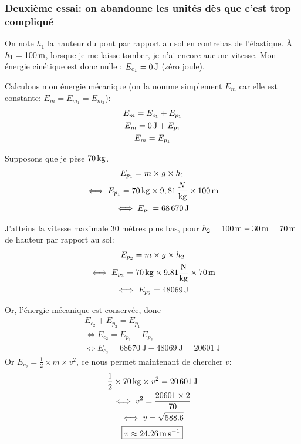 \subsubsection{Deuxième essai: on abandonne les unités dès que c'est trop compliqué}

On note $h_1$ la hauteur du pont par rapport au sol en contrebas de l'élastique. À $h_1=100\,\mathrm{m}$, lorsque je me laisse tomber, je n’ai encore aucune vitesse. Mon énergie cinétique est donc nulle : $E_{c_1} = 0\,\mathrm{J}$ (zéro joule).

Calculons mon énergie mécanique (on la nomme simplement $E_m$ car elle est constante: $E_m = E_{m_1} = E_{m_2}$):
\begin{gather*}
    E_m = E_{c_1} + E_{p_1} \\
    E_m = 0\,\mathrm{J }+ E_{p_1} \\
    E_m = E_{p_1}
\end{gather*}

Supposons que je pèse $70\,\mathrm{kg}$.
\begin{gather*}
    E_{p_1} = m \times g \times h_1 \\
    \iff E_{p_1} = 70\,\mathrm{kg} \times 9,81{\frac{N}{\,\mathrm{kg}}} \times 100\,\mathrm{m} \\
    \iff E_{p_1} = \SI{68670}{\joule}
\end{gather*}

J'atteins la vitesse maximale 30 mètres plus bas, pour $h_{2} = 100\,\mathrm{m} - 30\,\mathrm{m} = 70\,\mathrm{m}$ de hauteur par rapport au sol:
\begin{gather*}
    E_{p_2} = m \times g \times h_2 \\
    \iff E_{p_2} = 70\,\mathrm{kg} \times \num{9,81}{\frac{\mathrm{N}}{\mathrm{kg}}} \times 70\,\mathrm{m} \\
    \iff E_{p_2} = 48069\,\mathrm{J}
\end{gather*}

Or, l'énergie mécanique est conservée, donc
\begin{gather*}
    E_{c_2} + E_{p_2} = E_{p_1} \\
    \iff E_{c_2} = E_{p_1} - E_{p_2} \\
    \iff E_{c_2} = \SI{68670}{\joule} - \SI{48069}{\joule} = \SI{20601}{\joule}
\end{gather*}
Or $E_{c_2} = \frac{1}{2} \times m \times v^2$, ce nous permet maintenant de chercher $v$:
\begin{gather*}
    \frac{1}{2} \times 70\,\mathrm{kg} \times v^2 = \SI{20601}{\joule} \\
    \iff v^2 = \frac{20601 \times 2}{70} \\
    \iff v = \sqrt{\num{588.6}} \\
    \boxed{v \approx \SI{24.26}{\meter\per\second}}
\end{gather*}